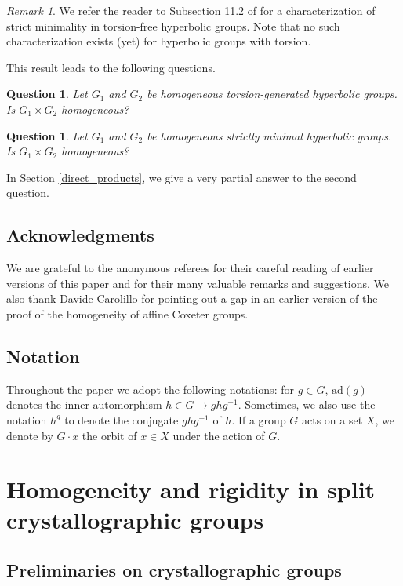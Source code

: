 \documentclass[a4paper, 11pt]{amsart}
\newtheorem{qu}[te]{Question}
\theoremstyle{definition}
\theoremstyle{remark}
\newtheorem{rk}[te]{Remark}
\begin{document}
\begin{rk}
We refer the reader to Subsection 11.2 of \cite{GLS} for a characterization of strict minimality in torsion-free hyperbolic groups. Note that no such characterization exists (yet) for hyperbolic groups with torsion.
\end{rk}

This result leads to the following questions.

\begin{qu}Let $G_1$ and $G_2$ be homogeneous torsion-generated hyperbolic groups. Is $G_1\times G_2$ homogeneous?
\end{qu}

\begin{qu}Let $G_1$ and $G_2$ be homogeneous strictly minimal hyperbolic groups. Is $G_1\times G_2$ homogeneous?
\end{qu}

In Section \ref{direct_products}, we give a very partial answer to the second question.

\subsection{Acknowledgments} We are grateful to the anonymous referees for their careful reading of earlier versions of this paper and for their many valuable remarks and suggestions. We also thank Davide Carolillo for pointing out a gap in an earlier version of the proof of the homogeneity of affine Coxeter groups.

\subsection{Notation}\label{section_notation}

Throughout the paper we adopt the following notations: for $g \in G$, $\mathrm{ad}(g)$ denotes the inner automorphism $h\in G\mapsto g h g^{-1}$. Sometimes, we also use the notation $h^g$ to denote the conjugate $g h g^{-1}$ of $h$. If a group $G$ acts on a set $X$, we denote by $G\cdot x$ the orbit of $x\in X$ under the action of $G$.

\section{Homogeneity and rigidity in split crystallographic groups}\label{homogeneity_crystallographic}

\subsection{Preliminaries on crystallographic groups}\label{prelim_crystallo}
\end{document}
